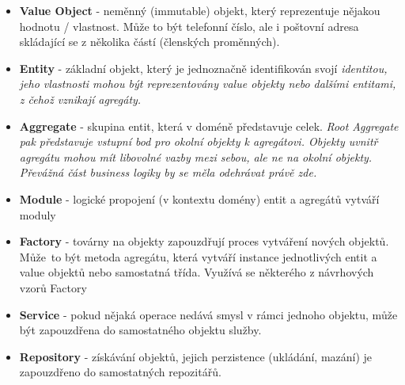 \begin{itemize}
	\item \textbf{Value Object} - neměnný (immutable) objekt, který reprezentuje nějakou hodnotu / vlastnost. Může to být telefonní číslo, ale i poštovní adresa skládající se z několika částí (členských proměnných).
	\item \textbf{Entity} - základní objekt, který je jednoznačně identifikován svojí \it{identitou}, jeho vlastnosti mohou být reprezentovány value objekty nebo dalšími entitami, z čehož vznikají agregáty.

	\item \textbf{Aggregate} - skupina entit, která v doméně představuje celek. \it{Root Aggregate} pak představuje vstupní bod pro okolní objekty k agregátovi. Objekty uvnitř agregátu mohou mít libovolné vazby mezi sebou, ale ne na okolní objekty. Převážná část business logiky by se měla odehrávat právě zde.
	\item \textbf{Module} - logické propojení (v kontextu domény) entit a agregátů vytváří moduly
	\item \textbf{Factory} - továrny na objekty zapouzdřují proces vytváření nových objektů. Může~to být metoda agregátu, která vytváří instance jednotlivých entit a value objektů nebo samostatná třída. Využívá se některého z návrhových vzorů Factory \cite{Vrana2013}\cite{Boehmer2015}
	\item \textbf{Service} - pokud nějaká operace nedává smysl v rámci jednoho objektu, může být zapouzdřena do samostatného objektu služby.
	\item \textbf{Repository} - získávání objektů, jejich perzistence (ukládání, mazání) je zapouzdřeno do samostatných repozitářů. 
\end{itemize}